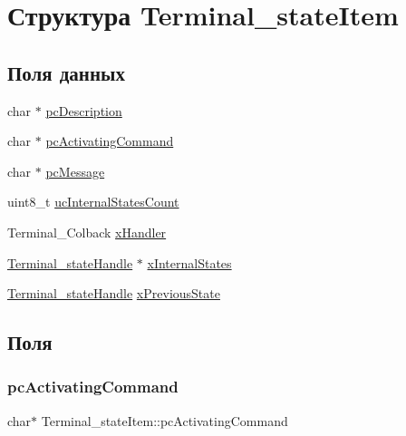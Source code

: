 \hypertarget{struct_terminal__state_item}{}\section{Структура Terminal\+\_\+state\+Item}
\label{struct_terminal__state_item}
\subsection*{Поля данных}
\begin{DoxyCompactItemize}
\item 
char $\ast$ \mbox{\hyperlink{struct_terminal__state_item_a14ec573f57a03adc8f73fc42e1ac01be}{pc\+Description}}
\item 
char $\ast$ \mbox{\hyperlink{struct_terminal__state_item_ae800515b294a117003abef239331dc1c}{pc\+Activating\+Command}}
\item 
char $\ast$ \mbox{\hyperlink{struct_terminal__state_item_aa7562ad3f6ccdbb4fd39ddf526f56a54}{pc\+Message}}
\item 
uint8\+\_\+t \mbox{\hyperlink{struct_terminal__state_item_a4db47774166fc69cb74722b5534d389b}{uc\+Internal\+States\+Count}}
\item 
Terminal\+\_\+\+Colback \mbox{\hyperlink{struct_terminal__state_item_a961f6e45a2829d0d7ec26cc7dabdbb4d}{x\+Handler}}
\item 
\mbox{\hyperlink{group__terminal_gadcd4acb437149111c071e40bccbac72a}{Terminal\+\_\+state\+Handle}} $\ast$ \mbox{\hyperlink{struct_terminal__state_item_ad50dafaf75a0e863d755cf80294b1f2c}{x\+Internal\+States}}
\item 
\mbox{\hyperlink{group__terminal_gadcd4acb437149111c071e40bccbac72a}{Terminal\+\_\+state\+Handle}} \mbox{\hyperlink{struct_terminal__state_item_ae20c8d76321e1eb5a2b587a0aab777a2}{x\+Previous\+State}}
\end{DoxyCompactItemize}


\subsection{Поля}
\mbox{\label{struct_terminal__state_item_ae800515b294a117003abef239331dc1c}} 
\subsubsection{\texorpdfstring{pcActivatingCommand}{pcActivatingCommand}}
{\footnotesize\ttfamily char$\ast$ Terminal\+\_\+state\+Item\+::pc\+Activating\+Command}

